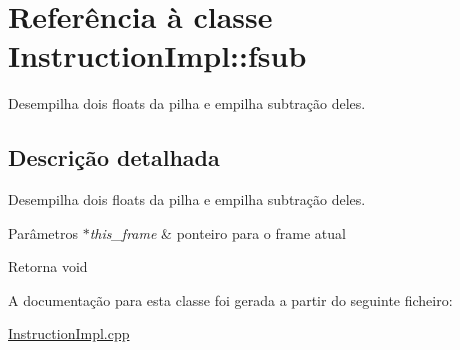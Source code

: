 \hypertarget{class_instruction_impl_1_1fsub}{}\section{Referência à classe Instruction\+Impl\+:\+:fsub}
\label{class_instruction_impl_1_1fsub}


Desempilha dois floats da pilha e empilha subtração deles.  




\subsection{Descrição detalhada}
Desempilha dois floats da pilha e empilha subtração deles. 


\begin{DoxyParams}{Parâmetros}
{\em $\ast$this\+\_\+frame} & ponteiro para o frame atual \\
\hline
\end{DoxyParams}
\begin{DoxyReturn}{Retorna}
void 
\end{DoxyReturn}


A documentação para esta classe foi gerada a partir do seguinte ficheiro\+:\begin{DoxyCompactItemize}
\item 
\hyperlink{_instruction_impl_8cpp}{Instruction\+Impl.\+cpp}\end{DoxyCompactItemize}
